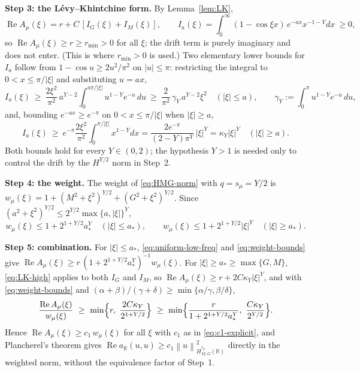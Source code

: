 \documentclass[11pt]{amsart}
\theoremstyle{remark}
\newcommand{\R}{\mathbb{R}}
\newcommand{\norm}[1]{\left\lVert #1\right\rVert}
\newcommand{\rf}{r}
\DeclareMathOperator{\Real}{Re}
\begin{document}
\medskip\noindent
\textbf{Step 3: the L\'evy--Khintchine form.}
By Lemma~\ref{lem:LK},
\begin{equation}
  \Real A_\mu(\xi)=\rf+C\,[I_G(\xi)+I_M(\xi)],\qquad
  I_a(\xi)=\int_0^\infty(1-\cos\xi x)\,e^{-ax}x^{-1-Y}dx\ \ge0,
  \label{eq:uniform-low-freq}
\end{equation}
so $\Real A_\mu(\xi)\ge \rf\ge r_{\min}>0$ for all $\xi$; the drift term is purely
imaginary and does not enter.  (This is where $r_{\min}>0$ is used.)  Two elementary
lower bounds for $I_a$ follow from $1-\cos u\ge 2u^2/\pi^2$ on $|u|\le\pi$: restricting the
integral to $0<x\le\pi/|\xi|$ and substituting $u=ax$,
\begin{equation}
  I_a(\xi)\ \ge\ \frac{2\xi^2}{\pi^2}\,a^{Y-2}\!\int_0^{a\pi/|\xi|}\!u^{1-Y}e^{-u}\,du
  \ \ge\ \frac{2}{\pi^2}\,\gamma_Y\,a^{Y-2}\xi^2\quad(|\xi|\le a),
  \qquad \gamma_Y:=\int_0^\pi u^{1-Y}e^{-u}\,du,
  \label{eq:LK-low}
\end{equation}
and, bounding $e^{-ax}\ge e^{-\pi}$ on $0<x\le\pi/|\xi|$ when $|\xi|\ge a$,
\begin{equation}
  I_a(\xi)\ \ge\ e^{-\pi}\frac{2\xi^2}{\pi^2}\int_0^{\pi/|\xi|}x^{1-Y}dx
  =\frac{2e^{-\pi}}{(2-Y)\pi^{Y}}\,|\xi|^{Y}=\kappa_Y|\xi|^Y\quad(|\xi|\ge a).
  \label{eq:LK-high}
\end{equation}
Both bounds hold for every $Y\in(0,2)$; the hypothesis $Y>1$ is needed only to
control the drift by the $H^{Y/2}$ norm in Step~2.

\medskip\noindent
\textbf{Step 4: the weight.}
The weight of \eqref{eq:HMG-norm} with $q=s_\mu=Y/2$ is
$w_\mu(\xi)=1+(M^2+\xi^2)^{Y/2}+(G^2+\xi^2)^{Y/2}$.  Since
$(a^2+\xi^2)^{Y/2}\le 2^{Y/2}\max\{a,|\xi|\}^{Y}$,
\begin{equation}
  w_\mu(\xi)\le 1+2^{1+Y/2}a_\ast^{Y}\quad(|\xi|\le a_\ast),\qquad
  w_\mu(\xi)\le 1+2^{1+Y/2}|\xi|^{Y}\quad(|\xi|\ge a_\ast).
  \label{eq:weight-bounds}
\end{equation}

\medskip\noindent
\textbf{Step 5: combination.}
For $|\xi|\le a_\ast$, \eqref{eq:uniform-low-freq} and \eqref{eq:weight-bounds} give
$\Real A_\mu(\xi)\ge \rf\,(1+2^{1+Y/2}a_\ast^{Y})^{-1}w_\mu(\xi)$.
For $|\xi|\ge a_\ast\ge\max\{G,M\}$, \eqref{eq:LK-high} applies to both $I_G$ and $I_M$, so
$\Real A_\mu(\xi)\ge \rf+2C\kappa_Y|\xi|^Y$, and with \eqref{eq:weight-bounds} and
$(\alpha+\beta)/(\gamma+\delta)\ge\min\{\alpha/\gamma,\beta/\delta\}$,
\[
  \frac{\Real A_\mu(\xi)}{w_\mu(\xi)}\ \ge\ \min\Bigl\{\rf,\ \frac{2C\kappa_Y}{2^{1+Y/2}}\Bigr\}
  \ \ge\ \min\Bigl\{\frac{\rf}{1+2^{1+Y/2}a_\ast^{Y}},\ \frac{C\kappa_Y}{2^{Y/2}}\Bigr\}.
\]
Hence $\Real A_\mu(\xi)\ge c_1\,w_\mu(\xi)$ for all $\xi$ with $c_1$ as in
\eqref{eq:c1-explicit}, and Plancherel's theorem gives
$\Real a_\R(u,u)\ge c_1\norm{u}_{H^{s_\mu}_{M,G}(\R)}^2$ directly in the weighted norm,
without the equivalence factor of Step~1.
\end{document}
